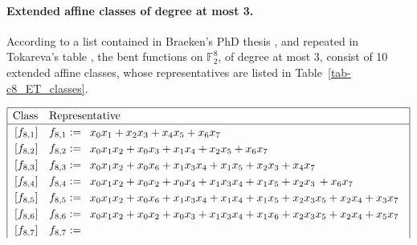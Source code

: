 \documentclass[12pt,a4paper]{article}
\newcommand{\mb}[1]{\mathbb{#1}}
\newcommand{\F}{\mb{F}}
\begin{document}
\paragraph*{Extended affine classes of degree at most 3.}
%
According to a list contained in Braeken's PhD thesis \cite[Section 5.5.2]{Bra06thesis},
and repeated in Tokareva's table \cite[Section 7.3]{Tok15bent},
the bent functions on $\F_2^8$, of degree at most 3, consist of 10
extended affine classes, whose representatives are listed in Table~\ref{tab-c8_ET_classes}.
\begin{table}[!bhpt] %
\small{}
\begin{align*}
\def\arraystretch{1.2}
\begin{array}{|cl|}
\hline
\text{Class} &
\text{Representative}
\\
\hline
\,[f_{ 8 , 1 }] & f_{ 8 , 1 } :=
\begin{array}{l}
x_{0} x_{1} + x_{2} x_{3} + x_{4} x_{5} + x_{6} x_{7}
\end{array}
\\
\,[f_{ 8 , 2 }] & f_{ 8 , 2 } :=
\begin{array}{l}
x_{0} x_{1} x_{2} + x_{0} x_{3} + x_{1} x_{4} + x_{2} x_{5} + x_{6} x_{7}
\end{array}
\\
\,[f_{ 8 , 3 }] & f_{ 8 , 3 } :=
\begin{array}{l}
x_{0} x_{1} x_{2} + x_{0} x_{6} + x_{1} x_{3} x_{4} + x_{1} x_{5} + x_{2} x_{3} + x_{4} x_{7}
\end{array}
\\
\,[f_{ 8 , 4 }] & f_{ 8 , 4 } :=
\begin{array}{l}
x_{0} x_{1} x_{2} + x_{0} x_{2} + x_{0} x_{4} + x_{1} x_{3} x_{4} + x_{1} x_{5} + x_{2} x_{3}\, +
x_{6} x_{7}
\end{array}
\\
\,[f_{ 8 , 5 }] & f_{ 8 , 5 } :=
\begin{array}{l}
x_{0} x_{1} x_{2} + x_{0} x_{6} + x_{1} x_{3} x_{4} + x_{1} x_{4} + x_{1} x_{5} + x_{2} x_{3} x_{5}
+ x_{2} x_{4} + x_{3} x_{7}
\end{array}
\\
\,[f_{ 8 , 6 }] & f_{ 8 , 6 } :=
\begin{array}{l}
x_{0} x_{1} x_{2} + x_{0} x_{2} + x_{0} x_{3} + x_{1} x_{3} x_{4} + x_{1} x_{6} + x_{2} x_{3} x_{5}
+ x_{2} x_{4} + x_{5} x_{7}
\end{array}
\\
\,[f_{ 8 , 7 }] & f_{ 8 , 7 } :=
\begin{array}{l}

\end{array}
\end{array}
\end{align*}
\end{table}
\end{document}
